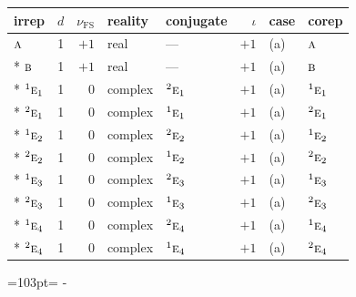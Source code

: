 \documentclass[10pt,a4paper]{article}
\newcommand{\needspace}[1]{\par\penalty-100\begingroup\dimen0=#1\relax\dimen2=\pagegoal
  \advance\dimen2-\pagetotal\ifdim\dimen0>\dimen2\relax\ifdim\dimen2>0pt\vfil\break\fi\fi
  \endgroup}
\numberwithin{equation}{section}
\newcommand{\irr}[1]{\text{\normalfont\scshape #1}}
\newcommand{\conjpair}[1]{{}^{#1}}
\newcommand{\fsind}{\nu_{\mathrm{FS}}}
\begin{document}
{\small\renewcommand{\arraystretch}{1.25}\setlength{\tabcolsep}{4pt}\begin{longtable}{@{}lrrllrll@{}}\toprule
irrep & $d$ & $\fsind$ & reality & conjugate & $\iota$ & case & corep\\\midrule\endhead
\bottomrule\endfoot\endlastfoot
$\irr{a}$ & 1 & $+1$ & real & --- & $+1$ & (a) & $\irr{a}$\\*
$\irr{b}$ & 1 & $+1$ & real & --- & $+1$ & (a) & $\irr{b}$\\*
$\conjpair{1}\irr{e}_{1}$ & 1 & $0$ & complex & $\conjpair{2}\irr{e}_{1}$ & $+1$ & (a) & $\conjpair{1}\irr{e}_{1}$\\*
$\conjpair{2}\irr{e}_{1}$ & 1 & $0$ & complex & $\conjpair{1}\irr{e}_{1}$ & $+1$ & (a) & $\conjpair{2}\irr{e}_{1}$\\*
$\conjpair{1}\irr{e}_{2}$ & 1 & $0$ & complex & $\conjpair{2}\irr{e}_{2}$ & $+1$ & (a) & $\conjpair{1}\irr{e}_{2}$\\*
$\conjpair{2}\irr{e}_{2}$ & 1 & $0$ & complex & $\conjpair{1}\irr{e}_{2}$ & $+1$ & (a) & $\conjpair{2}\irr{e}_{2}$\\*
$\conjpair{1}\irr{e}_{3}$ & 1 & $0$ & complex & $\conjpair{2}\irr{e}_{3}$ & $+1$ & (a) & $\conjpair{1}\irr{e}_{3}$\\*
$\conjpair{2}\irr{e}_{3}$ & 1 & $0$ & complex & $\conjpair{1}\irr{e}_{3}$ & $+1$ & (a) & $\conjpair{2}\irr{e}_{3}$\\*
$\conjpair{1}\irr{e}_{4}$ & 1 & $0$ & complex & $\conjpair{2}\irr{e}_{4}$ & $+1$ & (a) & $\conjpair{1}\irr{e}_{4}$\\*
$\conjpair{2}\irr{e}_{4}$ & 1 & $0$ & complex & $\conjpair{1}\irr{e}_{4}$ & $+1$ & (a) & $\conjpair{2}\irr{e}_{4}$\\
\bottomrule\end{longtable}}
\needspace{103pt}
\end{document}
